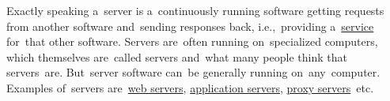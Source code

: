 \label{server}
Exactly speaking a~server is a~continuously running software getting requests from another software and~sending responses back, i.e.,~providing a~\hyperref[applicationprocessprogramservicethread]{service} for~that other software.
Servers are~often running on~specialized computers, which themselves are~called servers and~what many people think that servers~are.
But~server software can~be generally running on~any~computer.
Examples of~servers are~\hyperref[webserver]{web servers}, \hyperref[applicationserver]{application servers}, \hyperref[proxy]{proxy servers}~etc.
